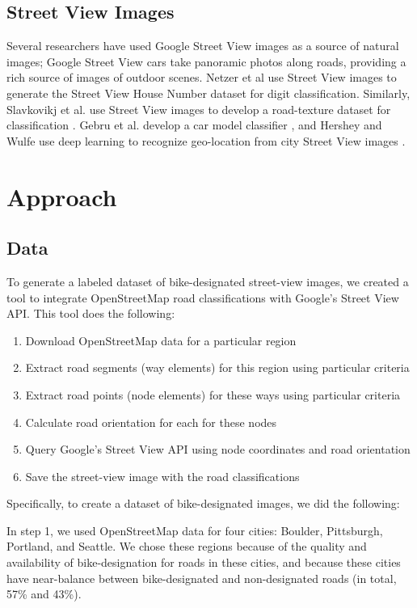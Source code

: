 \documentclass[10pt,twocolumn,letterpaper]{article}
\begin{document}
\subsection{Street View Images}
Several researchers have used Google Street View images as a source of natural images; Google Street View cars take panoramic photos along roads, providing a rich source of images of outdoor scenes. Netzer et al use Street View images to generate the Street View House Number dataset for digit classification. Similarly, Slavkovikj et al. use Street View images to develop a road-texture dataset for classification \cite{slavkovikj2014image}. Gebru et al. develop a car model classifier \cite{DBLP:journals/corr/GebruKWCDLF17}, and Hershey and Wulfe use deep learning to recognize geo-location from city Street View images \cite{hersheyrecognizing}.

\section{Approach}
\label{sec:approach}

\subsection{Data}
To generate a labeled dataset of bike-designated street-view images, we created a tool to integrate OpenStreetMap road classifications with Google's Street View API. This tool does the following:
\begin{enumerate}
\item Download OpenStreetMap data for a particular region
\item Extract road segments (way elements) for this region using particular criteria
\item Extract road points (node elements) for these ways using particular criteria
\item Calculate road orientation for each for these nodes
\item Query Google's Street View API using node coordinates and road orientation
\item Save the street-view image with the road classifications
\end{enumerate}
Specifically, to create a dataset of bike-designated images, we did the following:

In step 1, we used OpenStreetMap data for four cities: Boulder, Pittsburgh, Portland, and Seattle. We chose these regions because of the quality and availability of bike-designation for roads in these cities, and because these cities have near-balance between bike-designated and non-designated roads (in total, 57\% and 43\%).
\end{document}
